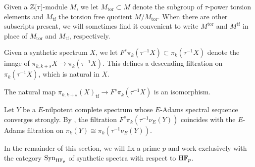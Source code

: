 \begin{dfn}
    Given a $\mathbb{Z}[\tau]$-module $M$, we let $M_{\mathrm{tor}} \subset M$ denote the subgroup of $\tau$-power torsion elements and $M_{\mathrm{tf}}$ the torsion free quotient $M / M_{\mathrm{tor}}$. When there are other subscripts present, we will sometimes find it convenient to write $M^{\mathrm{tor}}$ and $M^{\mathrm{tf}}$ in place of $M_{\mathrm{tor}}$ and $M_{\mathrm{tf}}$, respectively.
\end{dfn}

\begin{dfn}\label{dfn:synth-filt}
    Given a synthetic spectrum $X$, we let $F^s \pi_{k} (\tau^{-1} X) \subset \pi_{k} (\tau^{-1} X)$ denote the image of $\pi_{k,k+s} X \to \pi_{k} (\tau^{-1} X)$. This defines a descending filtration on $\pi_k (\tau^{-1} X)$, which is natural in $X$.
\end{dfn}

\begin{rmk}
  The natural map $\pi_{k,k+s} (X)_{\mathrm{tf}} \to F^s \pi_k (\tau^{-1} X)$ is an isomorphism.
\end{rmk}

\begin{rmk}
    Let $Y$ be a $E$-nilpotent complete spectrum whose $E$-Adams spectral sequence converges strongly. By , the filtration $F^s \pi_k (\tau^{-1} \nu_E (Y))$ coincides with the $E$-Adams filtration on $\pi_k (Y) \cong \pi_k (\tau^{-1} \nu_E (Y))$.
\end{rmk}

\begin{cnv}
    In the remainder of this section, we will fix a prime $p$ and work exclusively with the category $\mathrm{Syn}_{\mathrm{H}\mathbb{F}_p}$ of synthetic spectra with respect to $\mathrm{H}\mathbb{F}_p$.
\end{cnv}

